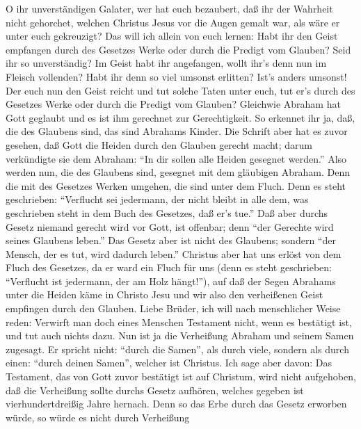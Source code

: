  O ihr unverständigen Galater, wer hat euch bezaubert, daß
ihr der Wahrheit nicht gehorchet, welchen Christus Jesus vor die Augen
gemalt war, als wäre er unter euch gekreuzigt?  Das will ich
allein von euch lernen: Habt ihr den Geist empfangen durch des Gesetzes
Werke oder durch die Predigt vom Glauben?  Seid ihr so
unverständig? Im Geist habt ihr angefangen, wollt ihr's denn nun im
Fleisch vollenden?  Habt ihr denn so viel umsonst erlitten?
Ist's anders umsonst!  Der euch nun den Geist reicht und tut
solche Taten unter euch, tut er's durch des Gesetzes Werke oder durch
die Predigt vom Glauben?  Gleichwie Abraham hat Gott
geglaubt und es ist ihm gerechnet zur Gerechtigkeit.  So
erkennet ihr ja, daß, die des Glaubens sind, das sind Abrahams Kinder.
 Die Schrift aber hat es zuvor gesehen, daß Gott die Heiden
durch den Glauben gerecht macht; darum verkündigte sie dem Abraham: ``In
dir sollen alle Heiden gesegnet werden.''  Also werden nun,
die des Glaubens sind, gesegnet mit dem gläubigen Abraham. 
Denn die mit des Gesetzes Werken umgehen, die sind unter dem Fluch. Denn
es steht geschrieben: ``Verflucht sei jedermann, der nicht bleibt in
alle dem, was geschrieben steht in dem Buch des Gesetzes, daß er's
tue.''  Daß aber durchs Gesetz niemand gerecht wird vor
Gott, ist offenbar; denn ``der Gerechte wird seines Glaubens leben.''
 Das Gesetz aber ist nicht des Glaubens; sondern ``der
Mensch, der es tut, wird dadurch leben.''  Christus aber
hat uns erlöst von dem Fluch des Gesetzes, da er ward ein Fluch für uns
(denn es steht geschrieben: ``Verflucht ist jedermann, der am Holz
hängt!''),  auf daß der Segen Abrahams unter die Heiden
käme in Christo Jesu und wir also den verheißenen Geist empfingen durch
den Glauben.  Liebe Brüder, ich will nach menschlicher
Weise reden: Verwirft man doch eines Menschen Testament nicht, wenn es
bestätigt ist, und tut auch nichts dazu.  Nun ist ja die
Verheißung Abraham und seinem Samen zugesagt. Er spricht nicht: ``durch
die Samen'', als durch viele, sondern als durch einen: ``durch deinen
Samen'', welcher ist Christus.  Ich sage aber davon: Das
Testament, das von Gott zuvor bestätigt ist auf Christum, wird nicht
aufgehoben, daß die Verheißung sollte durchs Gesetz aufhören, welches
gegeben ist vierhundertdreißig Jahre hernach.  Denn so das
Erbe durch das Gesetz erworben würde, so würde es nicht durch Verheißung
